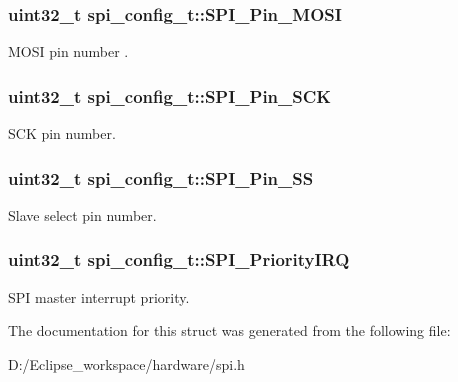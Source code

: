 \subsubsection[{S\+P\+I\+\_\+\+Pin\+\_\+\+M\+O\+S\+I}]{\setlength{\rightskip}{0pt plus 5cm}uint32\+\_\+t spi\+\_\+config\+\_\+t\+::\+S\+P\+I\+\_\+\+Pin\+\_\+\+M\+O\+S\+I}\label{structspi__config__t_a89ded8ee677dc15a50fef11237137fad}
M\+O\+S\+I pin number . \hypertarget{structspi__config__t_a757ca4b282e3ca8e6eb542092d2b24a9}{}
\subsubsection[{S\+P\+I\+\_\+\+Pin\+\_\+\+S\+C\+K}]{\setlength{\rightskip}{0pt plus 5cm}uint32\+\_\+t spi\+\_\+config\+\_\+t\+::\+S\+P\+I\+\_\+\+Pin\+\_\+\+S\+C\+K}\label{structspi__config__t_a757ca4b282e3ca8e6eb542092d2b24a9}
S\+C\+K pin number. \hypertarget{structspi__config__t_ad89bce38af613f58fa4510939a3a4808}{}
\subsubsection[{S\+P\+I\+\_\+\+Pin\+\_\+\+S\+S}]{\setlength{\rightskip}{0pt plus 5cm}uint32\+\_\+t spi\+\_\+config\+\_\+t\+::\+S\+P\+I\+\_\+\+Pin\+\_\+\+S\+S}\label{structspi__config__t_ad89bce38af613f58fa4510939a3a4808}
Slave select pin number. \hypertarget{structspi__config__t_a406e10b178f91ded58d0825fa92b7466}{}
\subsubsection[{S\+P\+I\+\_\+\+Priority\+I\+R\+Q}]{\setlength{\rightskip}{0pt plus 5cm}uint32\+\_\+t spi\+\_\+config\+\_\+t\+::\+S\+P\+I\+\_\+\+Priority\+I\+R\+Q}\label{structspi__config__t_a406e10b178f91ded58d0825fa92b7466}
S\+P\+I master interrupt priority. 

The documentation for this struct was generated from the following file\+:\begin{DoxyCompactItemize}
\item 
D\+:/\+Eclipse\+\_\+workspace/hardware/spi.\+h\end{DoxyCompactItemize}
